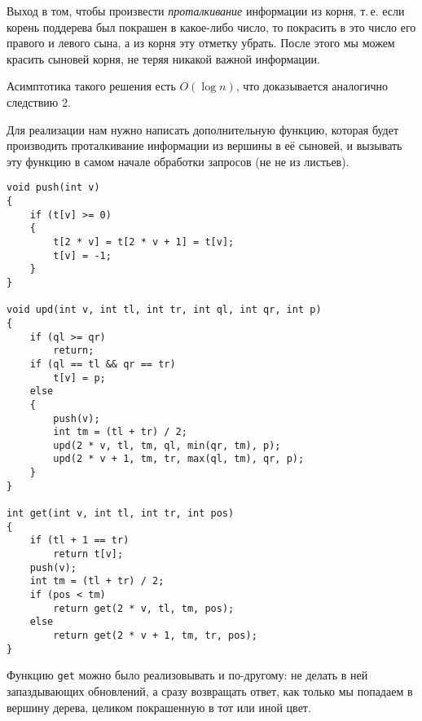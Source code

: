 Выход в том, чтобы произвести \textit{проталкивание} информации из корня, т.\,е. если корень поддерева был покрашен в какое-либо число, то покрасить в это число его правого и левого сына, а из корня эту отметку убрать. После этого мы можем красить сыновей корня, не теряя никакой важной информации.

Асимптотика такого решения есть $O(\log n)$, что доказывается аналогично следствию 2.

Для реализации нам нужно написать дополнительную функцию, которая будет производить проталкивание информации из вершины в её сыновей, и вызывать эту функцию в самом начале обработки запросов (не не из листьев).

\begin{verbatim}
void push(int v)
{
    if (t[v] >= 0)
    {
        t[2 * v] = t[2 * v + 1] = t[v];
        t[v] = -1;
    }
}

void upd(int v, int tl, int tr, int ql, int qr, int p)
{
    if (ql >= qr)
        return;
    if (ql == tl && qr == tr)
        t[v] = p;
    else
    {
        push(v);
        int tm = (tl + tr) / 2;
        upd(2 * v, tl, tm, ql, min(qr, tm), p);
        upd(2 * v + 1, tm, tr, max(ql, tm), qr, p);
    }
}

int get(int v, int tl, int tr, int pos)
{
    if (tl + 1 == tr)
        return t[v];
    push(v);
    int tm = (tl + tr) / 2;
    if (pos < tm)
        return get(2 * v, tl, tm, pos);
    else
        return get(2 * v + 1, tm, tr, pos);
}
\end{verbatim}

\begin{remark}
    Функцию \texttt{get} можно было реализовывать и по-другому: не делать в ней запаздывающих обновлений, а сразу возвращать ответ, как только мы попадаем в вершину дерева, целиком покрашенную в тот или иной цвет.
\end{remark}
